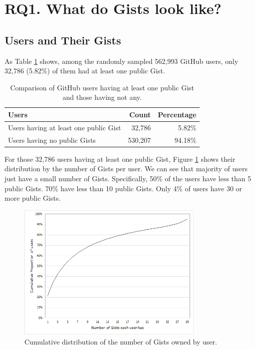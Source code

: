\section{RQ1. What do Gists look like?}

\subsection{Users and Their Gists}

As Table \ref{tb:userdistribution} shows, among the randomly sampled 562,993 GitHub users, only 32,786 (5.82\%) of them had at least one public Gist. 

\begin{table}[!htb]
 \begin{center}
 \begin{tabular}{@{}lrr} 
    \textbf{Users} &   \textbf{Count}        &  \textbf{Percentage} \\ \hline
    Users having at least one public Gist      &   32,786                 &   5.82\%             \\ 
    Users having no public Gists               &   530,207                &   94.18\%             \\ \hline
 \end{tabular}
 \end{center}
 \caption{Comparison of GitHub users having at least one public Gist and those having not any.}
 \label{tb:userdistribution}
\end{table}

For those 32,786 users having at least one public Gist, Figure \ref{fig:gistproportion} shows their distribution by the number of Gists per user. We can see that majority of users just have a small number of Gists. Specifically, 50\% of the users have less than 5 public Gists. 70\% have less than 10 public Gists. Only 4\% of users have 30 or more public Gists.

\begin{figure}[!htb]
	\centering
	\includegraphics[width=0.8\textwidth]{figures/GistProportion.png}
	\caption{Cumulative distribution of the number of Gists owned by user.}
	\label{fig:gistproportion}
\end{figure}


